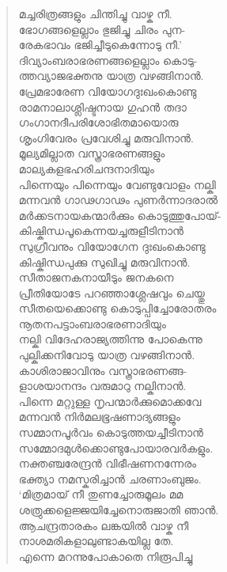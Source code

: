 \begin{verse}
മച്ചരിത്രങ്ങളും ചിന്തിച്ചു വാഴ്ക നീ.\\
ഭോഗങ്ങളെല്ലാം ഭുജിച്ചു ചിരം പുന-\\
രേകഭാവം ഭജിച്ചീടുകെന്നോടു നീ.’\\
ദിവ്യാംബരാഭരണങ്ങളെല്ലാം കൊടു-\\
ത്തവ്യാജഭക്തനു യാത്ര വഴങ്ങിനാന്‍.\\
പ്രേമഭാരേണ വിയോഗദുഃഖംകൊണ്ടു\\
രാമനാലാശ്ലിഷ്ടനായ ഗുഹന്‍ തദാ\\
ഗംഗാനദീപരിശോഭിതമായൊരു\\
ശൃംഗിവേരം പ്രവേശിച്ചു മരുവിനാന്‍.\\
മൂല്യമില്ലാത വസ്ത്രാഭരണങ്ങളും\\
മാല്യകളഭഹരിചന്ദനാദിയും\\
പിന്നെയും പിന്നെയും വേണ്ടുവോളം നല്കി\\
മന്നവന്‍ ഗാഢഗാഢം പുണര്‍ന്നാദരാല്‍\\
മര്‍ക്കടനായകന്മാര്‍ക്കും കൊടുത്തുപോയ്-\\
കിഷ്കിന്ധപൂകെന്നയച്ചരുളീടിനാന്‍\\
സുഗ്രീവനും വിയോഗേന ദുഃഖംകൊണ്ടു\\
കിഷ്കിന്ധപുക്കു സുഖിച്ചു മരുവിനാന്‍.\\
സീതാജനകനായീടും ജനകനെ\\
പ്രീതിയോടേ പറഞ്ഞാശ്ലേഷവും ചെയ്തു\\
സീതയെക്കൊണ്ടു കൊടുപ്പിച്ചോരോതരം\\
നൂതനപട്ടാംബരാഭരണാദിയും\\
നല്കി വിദേഹരാജ്യത്തിന്നു പോകെന്നു\\
പുല്കിക്കനിവോടു യാത്ര വഴങ്ങിനാന്‍.\\
കാശിരാജാവിനും വസ്ത്രാഭരണങ്ങ-\\
ളാശയാനന്ദം വരുമാറു നല്കിനാന്‍.\\
പിന്നെ മറ്റുള്ള നൃപന്മാര്‍ക്കുമൊക്കവേ\\
മന്നവന്‍ നിര്‍മലഭൂഷണാദ്യങ്ങളും\\
സമ്മാനപൂര്‍വം കൊടുത്തയച്ചീടിനാന്‍\\
സമ്മോദമുള്‍ക്കൊണ്ടുപോയാരവര്‍കളും.\\
നക്തഞ്ചരേന്ദ്രന്‍ വിഭീഷണനന്നേരം\\
ഭക്ത്യാ നമസ്കരിച്ചാന്‍ ചരണാംബുജം.\\
‘മിത്രമായ് നീ തുണച്ചോരുമൂലം മമ\\
ശത്രുക്കളെജ്ജയിച്ചേനൊരുജാതി ഞാന്‍.\\
ആചന്ദ്രതാരകം ലങ്കയില്‍ വാഴ്ക നീ\\
നാശമരികളാലുണ്ടാകയില്ല തേ.\\
എന്നെ മറന്നുപോകാതെ നിരൂപിച്ചു\\

\end{verse}
